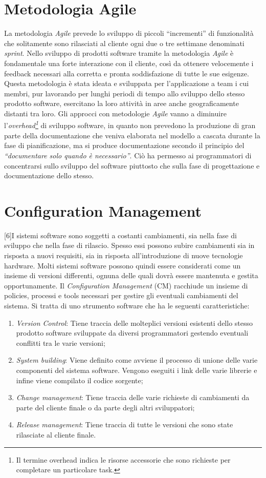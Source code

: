 \section{Metodologia Agile}
La metodologia \emph{Agile} prevede lo sviluppo di piccoli “incrementi” di funzionalità che solitamente sono rilasciati al cliente ogni due o tre settimane denominati \emph{sprint}. Nello sviluppo di prodotti software tramite la metodologia \emph{Agile}
è fondamentale una forte interazione con il cliente, così da ottenere velocemente i feedback necessari alla corretta e pronta soddisfazione di tutte le sue esigenze.
Questa metodologia è stata ideata e sviluppata per l’applicazione a team i cui membri, pur lavorando per lunghi periodi di tempo allo sviluppo dello stesso prodotto software, esercitano la loro attività in aree anche geograficamente distanti tra loro. Gli approcci con metodologie \emph{Agile} vanno a diminuire l’\emph{overhead\footnote{Il termine overhead indica le risorse accessorie che sono richieste per completare un particolare task.}} di sviluppo software, in quanto non prevedono la produzione di gran parte della documentazione che veniva elaborata nel modello a cascata durante la fase di pianificazione, ma si produce documentazione secondo il principio del \emph{“documentare solo quando è necessario”}. Ciò ha permesso ai programmatori di
concentrarsi sullo sviluppo del software piuttosto che sulla fase di progettazione e documentazione dello stesso.
\section{Configuration Management}
[6]I sistemi software sono soggetti a costanti cambiamenti, sia nella fase di
sviluppo che nella fase di rilascio. Spesso essi possono subire cambiamenti sia in risposta a nuovi requisiti, sia in risposta all’introduzione di nuove tecnologie
hardware. Molti sistemi software possono quindi essere considerati come un insieme di versioni differenti, ognuna delle quali dovrà essere mantenuta e gestita
opportunamente.
Il \emph{Configuration Management} (CM) racchiude un insieme di policies, processi e tools necessari per gestire gli eventuali cambiamenti del sistema. Si tratta di uno strumento software che ha le seguenti caratteristiche:
\begin{enumerate}
	\item \emph{Version Control}: Tiene traccia delle molteplici versioni esistenti dello stesso prodotto software sviluppate da diversi programmatori gestendo eventuali conflitti tra le varie versioni;
	\item \emph{System building}: Viene definito come avviene il processo di unione delle varie componenti del sistema software. Vengono eseguiti i link delle varie librerie e infine viene compilato il codice sorgente;
	\item \emph{Change management}: Tiene traccia delle varie richieste di cambiamenti da parte del cliente finale o da parte degli altri sviluppatori;
	\item \emph{Release management}: Tiene traccia di tutte le versioni che sono state rilasciate al cliente finale.
\end{enumerate}
